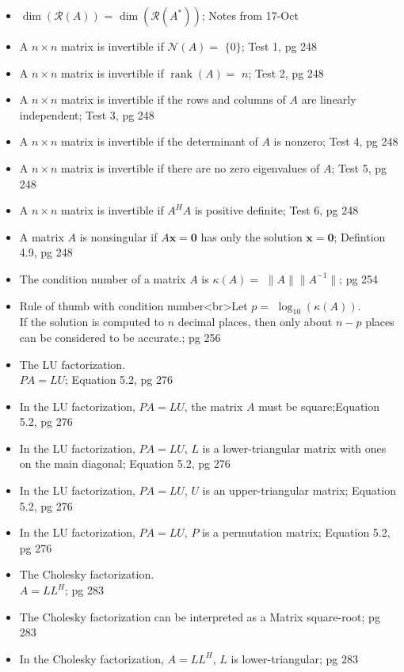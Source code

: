 \documentclass{article}
\begin{document}
\begin{multicols}{2}
\begin{itemize}
\item $\operatorname{dim}(\mathcal{R}(A))$ = $\operatorname{dim}(\mathcal{R}(A^*))$; Notes from 17-Oct
\item A $n \times n$ matrix is invertible if $\mathcal{N}(A) = $ $\{0\}$; Test 1, pg 248
\item A $n \times n$ matrix is invertible if $\operatorname{rank}(A) =$ $n$; Test 2, pg 248
\item A $n \times n$ matrix is invertible if the rows and columns of $A$ are linearly independent; Test 3, pg 248
\item A $n \times n$ matrix is invertible if the determinant of $A$ is nonzero; Test 4, pg 248
\item A $n \times n$ matrix is invertible if there are no zero eigenvalues of $A$; Test 5, pg 248
\item A $n \times n$ matrix is invertible if $A^H A$ is positive definite; Test 6, pg 248
\item A matrix $A$ is nonsingular if $A\mathbf{x} = \mathbf{0}$ has only the solution $\mathbf{x} = \mathbf{0}$; Defintion 4.9, pg 248
\item The condition number of a matrix $A$ is $\kappa(A) = $ $ \|A\| \|A^{-1}\| $; pg 254
\item Rule of thumb with condition number<br>Let $p = $ $ \log_{10}(\kappa(A)) $. \\
If the solution is computed to $n$ decimal places, then only about $n -p$ places can be considered to be accurate.; pg 256
\item The LU factorization. \\
$PA = LU$; Equation 5.2, pg 276 
\item In the LU factorization, $PA = LU$, the matrix $A$ must be square;Equation 5.2, pg 276
\item In the LU factorization, $PA = LU$, $L$ is a lower-triangular matrix with ones on the main diagonal; Equation 5.2, pg 276 
\item In the LU factorization, $PA = LU$, $U$ is an upper-triangular matrix; Equation 5.2, pg 276 
\item In the LU factorization, $PA = LU$, $P$ is a permutation matrix; Equation 5.2, pg 276 
\item The Cholesky factorization. \\
$A = LL^H$; pg 283
\item The Cholesky factorization can be interpreted as a Matrix square-root; pg 283
\item In the Cholesky factorization, $A = LL^H$, $L$ is lower-triangular; pg 283

\end{itemize}
\end{multicols}
\end{document}
